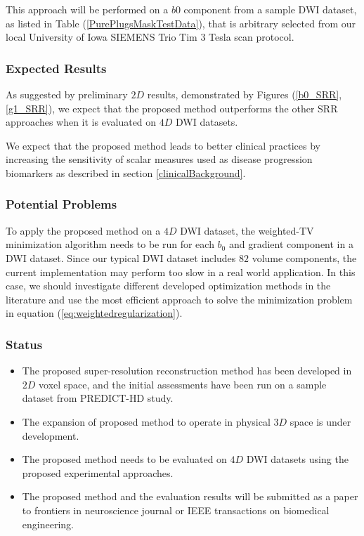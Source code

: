 This approach will be performed on a $b0$ component from a sample DWI dataset, as listed in Table (\ref{PurePlugsMaskTestData}), that is arbitrary selected from our local University of Iowa SIEMENS Trio Tim $3$ Tesla scan protocol.
\newline

\subsubsection{Expected Results}

As suggested by preliminary $2D$ results, demonstrated by Figures (\ref{b0_SRR}, \ref{g1_SRR}), we expect that the proposed method outperforms the other SRR approaches when it is evaluated on $4D$ DWI datasets.

We expect that the proposed method leads to better clinical practices by increasing the sensitivity of scalar measures used as disease progression biomarkers as described in section \ref{clinicalBackground}.
\newline

\subsubsection{Potential Problems}

To apply the proposed method on a $4D$ DWI dataset, the weighted-TV minimization algorithm needs to be run for each $b_0$ and gradient component in a DWI dataset. Since our typical DWI dataset includes $82$ volume components, the current implementation may perform too slow in a real world application. In this case, we should investigate different developed optimization methods in the literature \cite{marquina2008, zhu2008, chambolle2011} and use the most efficient approach to solve the minimization problem in equation (\ref{eq:weightedregularization}).
\newline

\subsubsection{Status}
\begin{itemize}
    \item The proposed super-resolution reconstruction method has been developed in $2D$ voxel space, and the initial assessments have been run on a sample dataset from PREDICT-HD study.
    \item The expansion of proposed method to operate in physical $3D$ space is under development.
    \item The proposed method needs to be evaluated on $4D$ DWI datasets using the proposed experimental approaches.
    \item The proposed method and the evaluation results will be submitted as a paper to frontiers in neuroscience journal or IEEE transactions on biomedical engineering.
\end{itemize}









\clearpage
